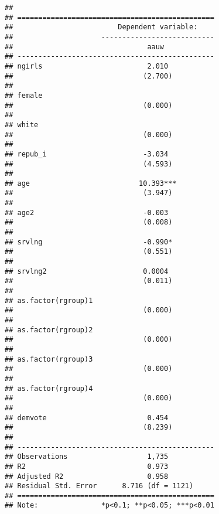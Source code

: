 \documentclass[
]{article}
\begin{document}
\begin{verbatim}
## 
## ===============================================
##                         Dependent variable:    
##                     ---------------------------
##                                aauw            
## -----------------------------------------------
## ngirls                         2.010           
##                               (2.700)          
##                                                
## female                                         
##                               (0.000)          
##                                                
## white                                          
##                               (0.000)          
##                                                
## repub_i                       -3.034           
##                               (4.593)          
##                                                
## age                          10.393***         
##                               (3.947)          
##                                                
## age2                          -0.003           
##                               (0.008)          
##                                                
## srvlng                        -0.990*          
##                               (0.551)          
##                                                
## srvlng2                       0.0004           
##                               (0.011)          
##                                                
## as.factor(rgroup)1                             
##                               (0.000)          
##                                                
## as.factor(rgroup)2                             
##                               (0.000)          
##                                                
## as.factor(rgroup)3                             
##                               (0.000)          
##                                                
## as.factor(rgroup)4                             
##                               (0.000)          
##                                                
## demvote                        0.454           
##                               (8.239)          
##                                                
## -----------------------------------------------
## Observations                   1,735           
## R2                             0.973           
## Adjusted R2                    0.958           
## Residual Std. Error      8.716 (df = 1121)     
## ===============================================
## Note:               *p<0.1; **p<0.05; ***p<0.01
\end{verbatim}
\end{document}
